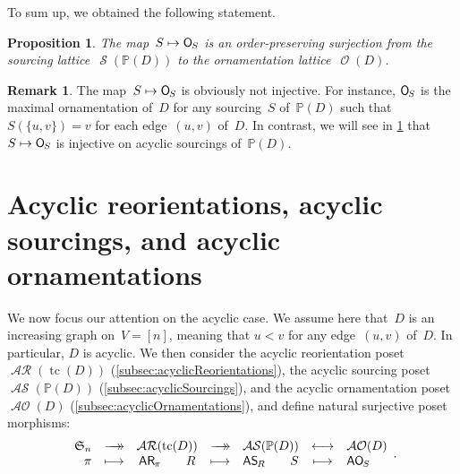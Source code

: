 \documentclass{amsart}
\newtheorem{proposition}[theorem]{Proposition}
\theoremstyle{definition}
\newtheorem{remark}[theorem]{Remark}
\renewcommand{\c}[1]{\mathcal{#1}} %
\newcommand{\surjection}{\longrightarrow\mathrel{\mkern-22mu}\rightarrow\,}
\newcommand{\bijection}{\longleftrightarrow}
\DeclareMathOperator{\tc}{tc} %
\newcommand{\Vincent}[1]{\todo[size=\tiny,color=blue!30]{ #1 \\ \hfill --- V.}\,}
\newcommand{\fS}{\mathfrak{S}} %
\newcommand{\mymap}[2]{\mathsf{#1}_{\hspace{-.7pt}#2}}
\DeclareMathOperator{\Orn}{\c{O}}  %
\newcommand{\orn}[1]{\mymap{O}{#1}}  %
\DeclareMathOperator{\AOrn}{\c{AO}}  %
\newcommand{\aorn}[1]{\mymap{AO}{#1}}  %
\DeclareMathOperator{\AReori}{\c{AR}}  %
\newcommand{\areori}[1]{\mymap{AR}{#1}}  %
\DeclareMathOperator{\rev}{rev} %
\DeclareMathOperator{\Sour}{\mathcal{S}}  %
\DeclareMathOperator{\ASour}{\mathcal{AS}}  %
\newcommand{\asour}[1]{\mymap{AS}{#1}}  %
\newcommand{\PP}{\mathbb P} %
\begin{document}
To sum up, we obtained the following statement.

\begin{proposition}
\label{prop:Sour2Orn}
The map~$S \mapsto \orn{S}$ is an order-preserving surjection from the sourcing lattice~$\Sour(\PP(D))$ to the ornamentation lattice~$\Orn(D)$.
\end{proposition}

\begin{remark}
The map~$S \mapsto \orn{S}$ is obviously not injective.
For instance, $\orn{S}$ is the maximal ornamentation of~$D$ for any sourcing~$S$ of~$\PP(D)$ such that~$S(\{u,v\}) = v$ for each edge~$(u,v)$ of~$D$.
In contrast, we will see in \cref{sec:acyclic} that~$S \mapsto \orn{S}$ is injective on acyclic sourcings of~$\PP(D)$.
\end{remark}



\section{Acyclic reorientations, acyclic sourcings, and acyclic ornamentations}
\label{sec:acyclic}

We now focus our attention on the acyclic case.
We assume here that~$D$ is an increasing graph on~$V = [n]$, meaning that $u < v$ for any edge~$(u,v)$ of~$D$. In particular, $D$ is acyclic.
We then consider the acyclic reorientation poset~$\AReori(\tc(D))$ (\cref{subsec:acyclicReorientations}), the acyclic sourcing poset~$\ASour(\PP(D))$ (\cref{subsec:acyclicSourcings}), and the acyclic ornamentation poset~$\AOrn(D)$ (\cref{subsec:acyclicOrnamentations}), and define natural surjective poset morphisms:
\[
\begin{array}{rcccccl}
	\fS_n & \surjection & \AReori(\tc(D)) & \surjection & \ASour(\PP(D)) & \bijection & \AOrn(D) \\
	\pi & \longmapsto & \areori{\pi} \qquad R & \longmapsto & \asour{R} \qquad S & \longmapsto & \aorn{S}
\end{array}
.
\]

\end{document}
